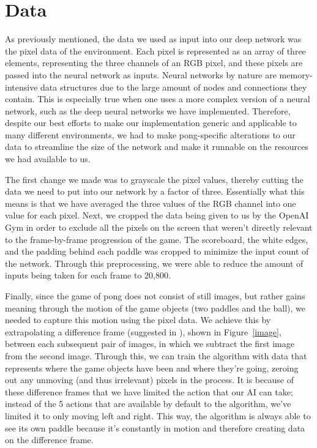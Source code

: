 \documentclass[12pt]{article}
\theoremstyle{plain}
\theoremstyle{definition}
\theoremstyle{remark}
\theoremstyle{plain}
\begin{document}
\section{Data}
\par
As previously mentioned, the data we used as input into our deep network was the pixel data of the environment.  Each pixel is represented as an array of three elements, representing the three channels of an RGB pixel, and these pixels are passed into the neural network as inputs.  Neural networks by nature are memory-intensive data structures due to the large amount of nodes and connections they contain.  This is especially true when one uses a more complex version of a neural network, such as the deep neural networks we have implemented.  Therefore, despite our best efforts to make our implementation generic and applicable to many different environments, we had to make pong-specific alterations to our data to streamline the size of the network and make it runnable on the resources we had available to us.
\par
The first change we made was to grayscale the pixel values, thereby cutting the data we need to put into our network by a factor of three.  Essentially what this means is that we have averaged the three values of the RGB channel into one value for each pixel.  Next, we cropped the data being given to us by the OpenAI Gym in order to exclude all the pixels on the screen that weren't directly relevant to the frame-by-frame progression of the game.  The scoreboard, the white edges, and the padding behind each paddle was cropped to minimize the input count of the network.  Through this preprocessing, we were able to reduce the amount of inputs being taken for each frame to 20,800.
\par
Finally, since the game of pong does not consist of still images, but rather gains meaning through the motion of the game objects (two paddles and the ball), we needed to capture this motion using the pixel data.  We achieve this by extrapolating a difference frame (suggested in \cite{karpathy}), shown in Figure~\ref{image}, between each subsequent pair of images, in which we subtract the first image from the second image.  Through this, we can train the algorithm with data that represents where the game objects have been and where they're going, zeroing out any unmoving (and thus irrelevant) pixels in the process.  It is because of these difference frames that we have limited the action that our AI can take; instead of the 5 actions that are available by default to the algorithm, we've limited it to only moving left and right.  This way, the algorithm is always able to see its own paddle because it's constantly in motion and therefore creating data on the difference frame.\newline
\end{document}
